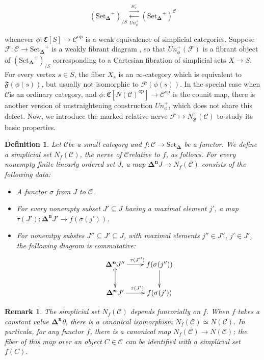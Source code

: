 \documentclass[12pt]{amsart}
\newcommand{\8}{\ensuremath{\infty}}
\newcommand{\C}{\ensuremath{\mathscr{C}}}
\newcommand{\Simplex}[1][n]{\ensuremath{\boldsymbol{\Delta^{#1}}}}
\newcommand{\SSet}{\ensuremath{\text{Set}_{\boldsymbol{\Delta}}}}
\newcommand{\op}[1]{\ensuremath{{#1}^{\text{op}}}}
\newcommand{\adj}[2]{\ensuremath{\overset{\overset{#1}{ \rightarrow}}{\underset{#2}{\leftarrow}}}}
\newtheorem{definition}{Definition}
\newtheorem{remark}{Remark}
\begin{document}
$$
  (\SSet^+)_{/S} \adj{St^+_\phi}{Un^+_\phi} (\SSet^+)^\C
$$

whenever $\phi: \mathfrak{C}[S] \rightarrow \op\C$ is a weak equivalence of simplicial categories. Suppose $\mathcal{F} : \C \rightarrow \SSet^{+}$ is a weakly fibrant diagram , so that $Un_\phi^+(\mathcal{F})$ is a fibrant object of $(\SSet^+)_{/S}$ corresponding to a Cartesian fibration of simplicial sets $X \rightarrow S$. For every vertex $s \in S$, the fiber $X_s$ is an \8-category which is equivalent to $\mathfrak{F}(\phi(s))$, but usually not isomorphic to $\mathcal{F}(\phi(s))$. In the special case when \C is an ordinary category, and $\phi: \mathfrak{C}[\op{N(\C)}] \rightarrow \op\C$ is the counit map, there is another version of unstraightening construction $Un_\phi^+$, which does not share this defect. Now, we introduce the marked relative nerve $\mathcal{F} \mapsto N_\mathfrak{F}^+(\C)$ to study its basic properties.

\begin{definition}
  Let \C be a small category and $f : \C \rightarrow \SSet$ be a functor. We define a simplicial set $N_f(\C)$, the nerve of \C relative to $f$, as follows. For every nonempty finite linearly ordered set $J$, a map $\Simplex{J} \rightarrow N_f(\C)$ consists of the following data:
  \begin{itemize}
    \item A functor $\sigma$ from $J$ to \C.
    \item For every nonempty subset $J' \subseteq J$ having a maximal element $j'$, a map $\tau(J') : \Simplex{J'} \rightarrow f(\sigma(j'))$.
    \item For nonemtpy substes $J'' \subseteq J' \subseteq J$, with maximal elements $j'' \in J''$, $j' \in J'$, the following diagram is commutative:
          $$
            \begin{xy}
              \xymatrix{
                \Simplex{J''}\ar[r]^{\tau(J'')}\ar@{(->}[d] & f(\sigma(j''))\ar[d] \\
                \Simplex{J'}\ar[r]^{\tau(J')} & f(\sigma(j'))
              }
            \end{xy}
          $$
  \end{itemize}
\end{definition}

\begin{remark}
  The simplicial set $N_f(\C)$ depends funcorially on $f$. When $f$ takes a constant value \Simplex{0}, there is a canonical isomorphism $N_f(\C) \simeq N(\C)$. In particula, for any functor $f$, there is a canonical map $N_f(\C) \rightarrow N(\C)$; the fiber of this map over an object $C \in \C$ can be identified with a simplicial set $f(C)$.
\end{remark}
\end{document}
